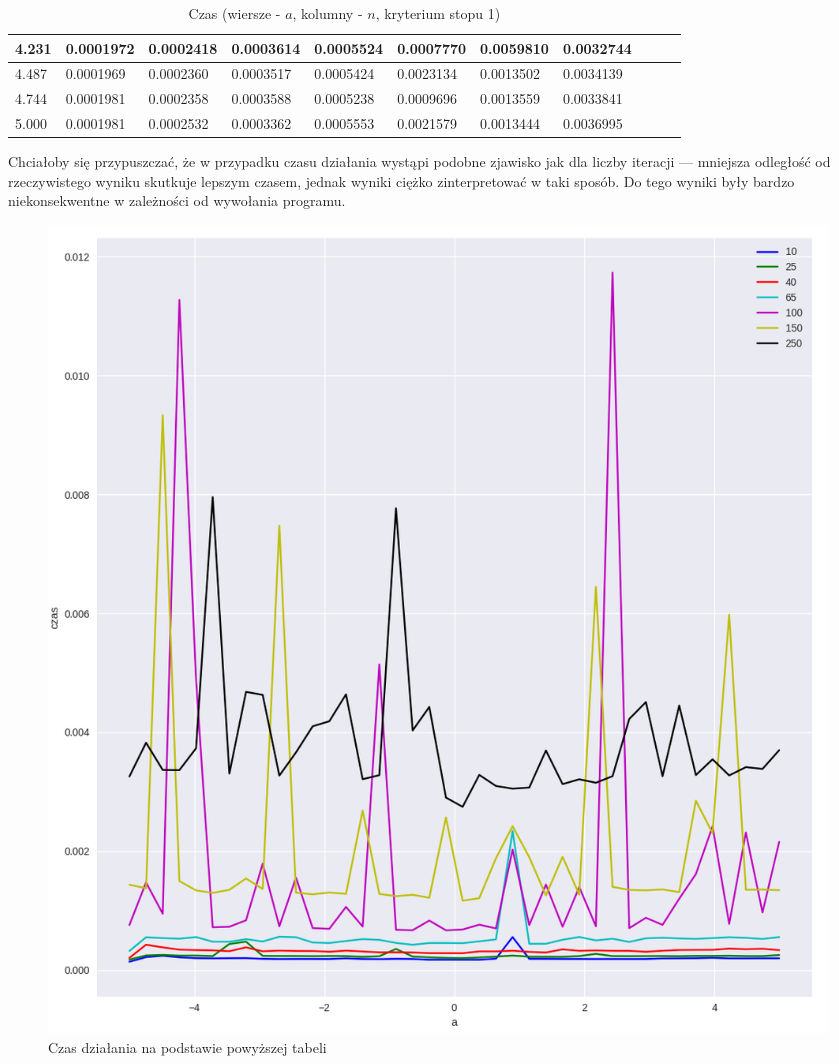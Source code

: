 \documentclass{article}
\begin{document}
\begin{table}[H]
\begin{adjustwidth}{-0.5in}{-.7in}
\begin{tabular}{|l|l|l|l|l|l|l|l|l|l|l|}
4.231 & 0.0001972 & 0.0002418 & 0.0003614 & 0.0005524 & 0.0007770 & 0.0059810 & 0.0032744 \\ \hline
4.487 & 0.0001969 & 0.0002360 & 0.0003517 & 0.0005424 & 0.0023134 & 0.0013502 & 0.0034139 \\ \hline
4.744 & 0.0001981 & 0.0002358 & 0.0003588 & 0.0005238 & 0.0009696 & 0.0013559 & 0.0033841 \\ \hline
5.000 & 0.0001981 & 0.0002532 & 0.0003362 & 0.0005553 & 0.0021579 & 0.0013444 & 0.0036995 \\ \hline
\end{tabular}
\end{adjustwidth}
\caption{Czas (wiersze - $a$, kolumny - $n$, kryterium stopu 1)}
\end{table}

Chciałoby się przypuszczać, że w przypadku czasu działania wystąpi podobne zjawisko jak dla liczby iteracji ---
mniejsza odległość od rzeczywistego wyniku skutkuje lepszym czasem, jednak wyniki ciężko zinterpretować w taki sposób.
Do tego wyniki były bardzo niekonsekwentne w zależności od wywołania programu.

\begin{figure}[H]
    \centering
    \includegraphics[width=\textwidth]{img/plot_8.png}
    \caption{Czas działania na podstawie powyższej tabeli}
\end{figure}
\end{document}
